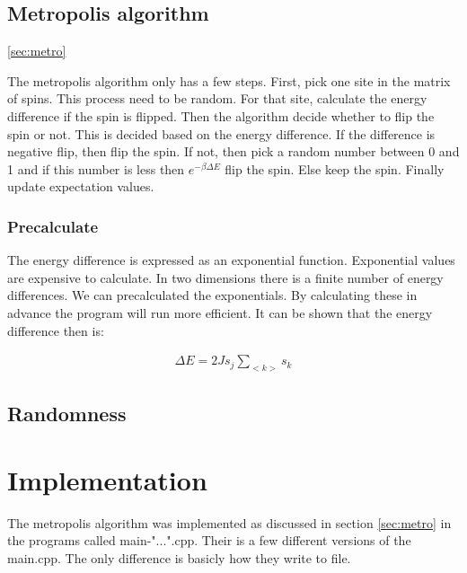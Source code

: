 
\subsection{Metropolis algorithm}\ref{sec:metro}

The metropolis algorithm only has a few steps. First, pick one site in the matrix of spins. This process need to be random. For that site, calculate the energy difference if the spin is flipped. Then the algorithm decide whether to flip the spin or not. This is decided based on the energy difference. If the difference is negative flip, then flip the spin. If not, then pick a random number between 0 and 1 and if this number is less then $e^{-\beta \Delta E}$ flip the spin. Else keep the spin. Finally update expectation values.

\subsubsection{Precalculate}

The energy difference is expressed as an exponential function. Exponential values are expensive to calculate. In two dimensions there is a finite number of energy differences. We can precalculated the exponentials. By calculating these in advance the program will run more efficient. It can be shown that the energy difference then is:

\begin{align*}
	\Delta E = 2J s_j \sum_{<k>} s_k
\end{align*}


\subsection{Randomness}



\section{Implementation}


The metropolis algorithm was implemented as discussed in section \ref{sec:metro} in the programs called main-"...".cpp. Their is a few different versions of the main.cpp. The only difference is basicly how they write to file. 


